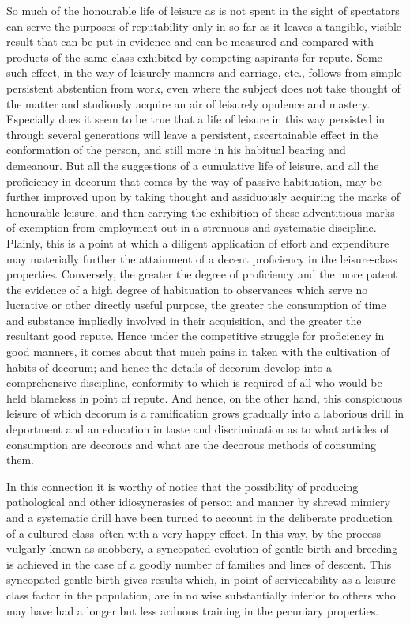 \documentclass[12pt]{report}
\begin{document}
So much of the honourable life of leisure as is not spent in the sight
of spectators can serve the purposes of reputability only in so far as
it leaves a tangible, visible result that can be put in evidence and can
be measured and compared with products of the same class exhibited
by competing aspirants for repute. Some such effect, in the way of
leisurely manners and carriage, etc., follows from simple persistent
abstention from work, even where the subject does not take thought
of the matter and studiously acquire an air of leisurely opulence and
mastery. Especially does it seem to be true that a life of leisure
in this way persisted in through several generations will leave a
persistent, ascertainable effect in the conformation of the person,
and still more in his habitual bearing and demeanour. But all the
suggestions of a cumulative life of leisure, and all the proficiency
in decorum that comes by the way of passive habituation, may be further
improved upon by taking thought and assiduously acquiring the marks
of honourable leisure, and then carrying the exhibition of these
adventitious marks of exemption from employment out in a strenuous and
systematic discipline. Plainly, this is a point at which a diligent
application of effort and expenditure may materially further the
attainment of a decent proficiency in the leisure-class properties.
Conversely, the greater the degree of proficiency and the more patent
the evidence of a high degree of habituation to observances which
serve no lucrative or other directly useful purpose, the greater
the consumption of time and substance impliedly involved in their
acquisition, and the greater the resultant good repute. Hence under the
competitive struggle for proficiency in good manners, it comes about
that much pains in taken with the cultivation of habits of decorum; and
hence the details of decorum develop into a comprehensive discipline,
conformity to which is required of all who would be held blameless in
point of repute. And hence, on the other hand, this conspicuous leisure
of which decorum is a ramification grows gradually into a laborious
drill in deportment and an education in taste and discrimination as
to what articles of consumption are decorous and what are the decorous
methods of consuming them.

In this connection it is worthy of notice that the possibility of
producing pathological and other idiosyncrasies of person and manner by
shrewd mimicry and a systematic drill have been turned to account in
the deliberate production of a cultured class--often with a very happy
effect. In this way, by the process vulgarly known as snobbery, a
syncopated evolution of gentle birth and breeding is achieved in
the case of a goodly number of families and lines of descent. This
syncopated gentle birth gives results which, in point of serviceability
as a leisure-class factor in the population, are in no wise
substantially inferior to others who may have had a longer but less
arduous training in the pecuniary properties.
\end{document}
